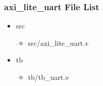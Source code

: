 \subsubsection{axi\_lite\_uart File List}
\begin{itemize}
\item src
	\begin{itemize}
	\item src/axi\_lite\_uart.v
	\end{itemize}
\item tb
	\begin{itemize}
	\item tb/tb\_uart.v
	\end{itemize}
\end{itemize}
